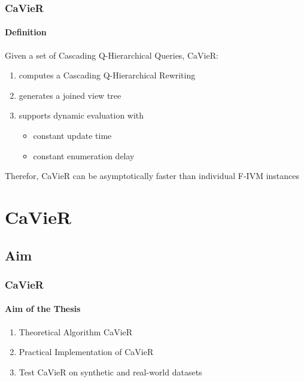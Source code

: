 \documentclass[
	11pt, %
]{beamer}
\begin{document}
\begin{frame}
	\frametitle{CaVieR}
	\framesubtitle{Definition}
	Given a set of Cascading Q-Hierarchical Queries, CaVieR:
	\begin{enumerate}
		\item  computes a Cascading Q-Hierarchical Rewriting
		\item  generates a joined view tree
		\item  supports dynamic evaluation with
		\begin{itemize}
			\item constant update time
			\item constant enumeration delay
		\end{itemize}
	\end{enumerate}
	
	Therefor, CaVieR can be asymptotically faster than individual F-IVM instances
\end{frame}


\section{CaVieR}
\subsection{Aim}
\begin{frame}
	\frametitle{CaVieR}
	\framesubtitle{Aim of the Thesis}
	\begin{enumerate}
		\item Theoretical Algorithm CaVieR
		\item Practical Implementation of CaVieR
		\item Test CaVieR on synthetic and real-world datasets
	\end{enumerate}
\end{frame}
\end{document}
